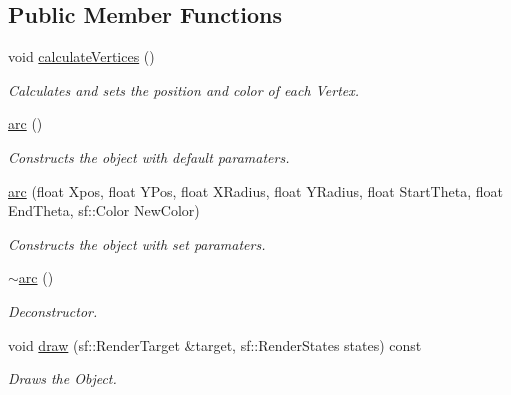 \subsection*{Public Member Functions}
\begin{DoxyCompactItemize}
\item 
\mbox{\label{classarc_af74708f0bbaf258e24ef12f713e3da72}} 
void \mbox{\hyperlink{classarc_af74708f0bbaf258e24ef12f713e3da72}{calculate\+Vertices}} ()
\begin{DoxyCompactList}\small\item\em Calculates and sets the position and color of each Vertex. \end{DoxyCompactList}\item 
\mbox{\label{classarc_aa90fc31672bae86b466e05d7107f9b31}} 
\mbox{\hyperlink{classarc_aa90fc31672bae86b466e05d7107f9b31}{arc}} ()
\begin{DoxyCompactList}\small\item\em Constructs the object with default paramaters. \end{DoxyCompactList}\item 
\mbox{\hyperlink{classarc_a7904b57378159ca3de7005fd0a90a90a}{arc}} (float Xpos, float Y\+Pos, float X\+Radius, float Y\+Radius, float Start\+Theta, float End\+Theta, sf\+::\+Color New\+Color)
\begin{DoxyCompactList}\small\item\em Constructs the object with set paramaters. \end{DoxyCompactList}\item 
\mbox{\label{classarc_a7ee6406fc154e5f92eba5ff140dd79af}} 
\mbox{\hyperlink{classarc_a7ee6406fc154e5f92eba5ff140dd79af}{$\sim$arc}} ()
\begin{DoxyCompactList}\small\item\em Deconstructor. \end{DoxyCompactList}\item 
\mbox{\label{classarc_aacf9c75f72272092f4a2241f4550f48b}} 
void \mbox{\hyperlink{classarc_aacf9c75f72272092f4a2241f4550f48b}{draw}} (sf\+::\+Render\+Target \&target, sf\+::\+Render\+States states) const
\begin{DoxyCompactList}\small\item\em Draws the Object. \end{DoxyCompactList}\end{DoxyCompactItemize}


